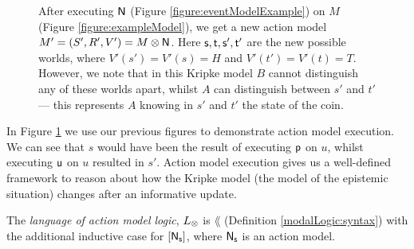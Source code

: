 \begin{figure}
\centering
{}
\caption[Kripke model after action model execution]{After executing $\mathrm{\mathsf{N}}$ (Figure \ref{figure:eventModelExample}) on $M$ (Figure
\ref{figure:exampleModel}), we get a new action model $M' = (S',R',V') = M \otimes \mathrm{\mathsf{N}}$.
Here $\mathrm{\mathsf{s}},\mathrm{\mathsf{t}},\mathrm{\mathsf{s}}',\mathrm{\mathsf{t}}'$ are the new possible worlds, where $V'(s') = V'(s) = H$ and $V'(t') =
V'(t) = T$.
However, we note that in this Kripke model $B$ cannot distinguish any of these worlds apart, whilst
$A$ can distinguish between $s'$ and $t'$ --- this represents $A$ knowing in $s'$ and $t'$ the state
of the coin.}
\label{figure:eventModelPostExecution}
\end{figure}

In Figure \ref{figure:eventModelPostExecution} we use our previous figures to
demonstrate action model execution.
We can see that $s$ would have been the result of executing $\mathrm{\mathsf{p}}$ on $u$, whilst executing
$\mathrm{\mathsf{u}}$ on $u$ resulted in $s'$.
Action model execution gives us a well-defined framework to reason about how the Kripke model
(the model of the epistemic situation) changes after an informative update.

\begin{defn} \label{actModelLogic:syntax}
	The {\em language of action model logic}, $L_{\otimes}$ is $\lang$ (Definition
	\ref{modalLogic:syntax}) with the additional inductive case for $[{\mathrm{\mathsf{N}}_\mathrm{\mathsf{s}}}]$, where
	$\mathrm{\mathsf{N}}_\mathrm{\mathsf{s}}$ is an action model.
\end{defn}

